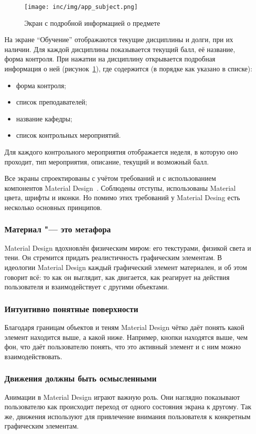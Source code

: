 \begin{figure}[ht]
  \centering
  \texttt{[image: inc/img/app\_subject.png]}
  \caption{Экран с подробной информацией о предмете}
  \label{fig:appSubject}
\end{figure}

На экране ``Обучение'' отображаются текущие дисциплины и долги, при их наличии.
Для каждой дисциплины показывается текущий балл, её название, форма контроля.
При нажатии на дисциплину открывается подробная информация о ней (рисунок~\ref{fig:appSubject}), где содержится (в порядке как указано в списке):
\begin{itemize}
  \item форма контроля;
  \item список преподавателей;
  \item название кафедры;
  \item список контрольных мероприятий.
\end{itemize}

Для каждого контрольного мероприятия отображается неделя, в которую оно проходит, тип мероприятия, описание, текущий и возможный балл.

Все экраны спроектированы с учётом требований и с использованием компонентов Material Design~\cite{md}.
Соблюдены отступы, использованы Material цвета, шрифты и иконки.
Но помимо этих требований у Material Desing есть несколько основных принципов.

\subsubsection*{Материал "--- это метафора}
Material Design вдохновлён физическим миром: его текстурами, физикой света и тени.
Он стремится придать реалистичность графическим элементам.
В идеологии Material Design каждый графический элемент материален, и об этом говорит всё: то как он выглядит, как двигается, как реагирует на действия пользователя и взаимодействует с другими объектами.

\subsubsection*{Интуитивно понятные поверхности}
Благодаря границам объектов и теням Material Design чётко даёт понять какой элемент находится выше, а какой ниже.
Например, кнопки находятся выше, чем фон, что даёт пользователю понять, что это активный элемент и с ним можно взаимодействовать.

\subsubsection*{Движения должны быть осмысленными}
Анимации в Material Design играют важную роль.
Они наглядно показывают пользователю как происходит переход от одного состояния экрана к другому.
Так же, движения используют для привлечение внимания пользователя к конкретным графическим элементам.

